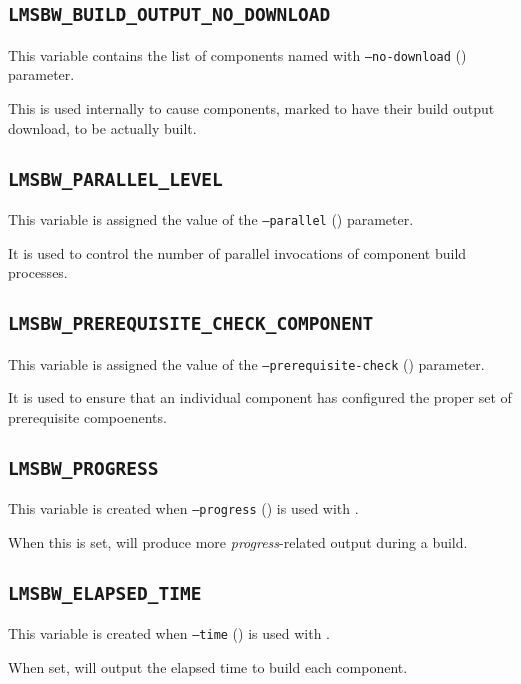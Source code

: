 \subsection{\texttt{LMSBW\_BUILD\_OUTPUT\_NO\_DOWNLOAD}}

This variable contains the list of components named with
\texttt{--no-download} () parameter.

This is used internally to cause components, marked to have their
build output download, to be actually built.

\subsection{\texttt{LMSBW\_PARALLEL\_LEVEL}}

This variable is assigned the value of the \texttt{--parallel}
() parameter.

It is used to control the number of parallel invocations of component
build processes.

\subsection{\texttt{LMSBW\_PREREQUISITE\_CHECK\_COMPONENT}}

This variable is assigned the value of the
\texttt{--prerequisite-check} ()
parameter.

It is used to ensure that an individual component has configured the
proper set of prerequisite compoenents.

\subsection{\texttt{LMSBW\_PROGRESS}}

This variable is created when \texttt{--progress}
() is used with \lmsbwcmd.

When this is set, \lmsbw will produce more \emph{progress}-related
output during a build.

\subsection{\texttt{LMSBW\_ELAPSED\_TIME}}

This variable is created when \texttt{--time} ()
is used with \lmsbwcmd.

When set, \lmsbw will output the elapsed time to build each component.

